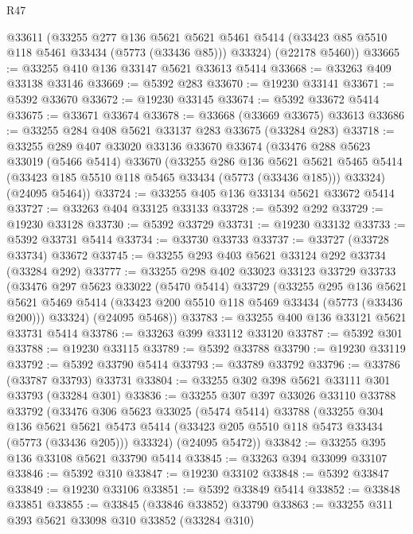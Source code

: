 \begin{lexlean}{R47}
\begin{coremodule}
      @33611
      (@33255
        @277
        @136
        @5621
        @5621
        @5461
        @5414
        (@33423 @85 @5510 @118 @5461 @33434 (@5773 (@33436 @85)))
        @33324)
      (@22178 @5460))
@33665 := @33255 @410 @136 @33147 @5621 @33613 @5414
@33668 := @33263 @409 @33138 @33146
@33669 := @5392 @283
@33670 := @19230 @33141
@33671 := @5392 @33670
@33672 := @19230 @33145
@33674 := @5392 @33672 @5414
@33675 := @33671 @33674
@33678 := @33668 (@33669 @33675) @33613
@33686 := @33255 @284 @408 @5621 @33137 @283 @33675 (@33284 @283)
@33718 := @33255
    @289
    @407
    @33020
    @33136
    @33670
    @33674
    (@33476
      @288
      @5623
      @33019
      (@5466 @5414)
      @33670
      (@33255
        @286
        @136
        @5621
        @5621
        @5465
        @5414
        (@33423 @185 @5510 @118 @5465 @33434 (@5773 (@33436 @185)))
        @33324)
      (@24095 @5464))
@33724 := @33255 @405 @136 @33134 @5621 @33672 @5414
@33727 := @33263 @404 @33125 @33133
@33728 := @5392 @292
@33729 := @19230 @33128
@33730 := @5392 @33729
@33731 := @19230 @33132
@33733 := @5392 @33731 @5414
@33734 := @33730 @33733
@33737 := @33727 (@33728 @33734) @33672
@33745 := @33255 @293 @403 @5621 @33124 @292 @33734 (@33284 @292)
@33777 := @33255
    @298
    @402
    @33023
    @33123
    @33729
    @33733
    (@33476
      @297
      @5623
      @33022
      (@5470 @5414)
      @33729
      (@33255
        @295
        @136
        @5621
        @5621
        @5469
        @5414
        (@33423 @200 @5510 @118 @5469 @33434 (@5773 (@33436 @200)))
        @33324)
      (@24095 @5468))
@33783 := @33255 @400 @136 @33121 @5621 @33731 @5414
@33786 := @33263 @399 @33112 @33120
@33787 := @5392 @301
@33788 := @19230 @33115
@33789 := @5392 @33788
@33790 := @19230 @33119
@33792 := @5392 @33790 @5414
@33793 := @33789 @33792
@33796 := @33786 (@33787 @33793) @33731
@33804 := @33255 @302 @398 @5621 @33111 @301 @33793 (@33284 @301)
@33836 := @33255
    @307
    @397
    @33026
    @33110
    @33788
    @33792
    (@33476
      @306
      @5623
      @33025
      (@5474 @5414)
      @33788
      (@33255
        @304
        @136
        @5621
        @5621
        @5473
        @5414
        (@33423 @205 @5510 @118 @5473 @33434 (@5773 (@33436 @205)))
        @33324)
      (@24095 @5472))
@33842 := @33255 @395 @136 @33108 @5621 @33790 @5414
@33845 := @33263 @394 @33099 @33107
@33846 := @5392 @310
@33847 := @19230 @33102
@33848 := @5392 @33847
@33849 := @19230 @33106
@33851 := @5392 @33849 @5414
@33852 := @33848 @33851
@33855 := @33845 (@33846 @33852) @33790
@33863 := @33255 @311 @393 @5621 @33098 @310 @33852 (@33284 @310)

\end{coremodule}
\end{lexlean}
